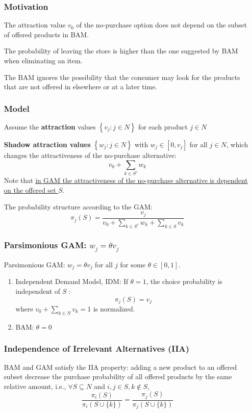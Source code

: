 \documentclass[11pt]{elegantbook}
\begin{document}
\subsubsection{Motivation}
The attraction value $v_0$ of the no-purchase option does not depend on the subset of offered products in BAM.

The probability of leaving the store is higher than the one suggested by BAM when eliminating an item.

The BAM ignores the possibility that the consumer may look for the products that are not offered in elsewhere or at a later time.

\subsubsection{Model}
Assume the \textbf{attraction} values $\left\{v_{j}: j \in N\right\}$ for each product $j \in N$

\textbf{Shadow attraction values} $\left\{w_{j}: j \in N\right\}$ with $w_{j} \in\left[0, v_{j}\right]$ for all $j \in N$, which changes the attractiveness of the no-purchase alternative:
$$
v_{0}+\sum_{k \in S^{c}} w_{k}
$$
Note that \underline{in GAM the attractiveness of the no-purchase alternative is dependent on the offered set $S$}.

The probability structure according to the GAM:
$$
\pi_{j}(S)=\frac{v_{j}}{v_{0}+\sum_{k \in S^{c}} w_{k}+\sum_{k \in S} v_{k}}
$$

\subsubsection{Parsimonious GAM: $w_{j}=\theta v_{j}$}
Parsimonious GAM: $w_{j}=\theta v_{j}$ for all $j$ for some $\theta \in[0,1]$.
\begin{enumerate}[$\bullet$]
    \item Independent Demand Model, IDM: If $\theta=1$, the choice probability is independent of $S$ :
    $$
    \pi_{j}(S)=v_{j}
    $$
    where $v_0+\sum_{k\in N}v_k=1$ is normalized.
    \item BAM: $\theta=0$
\end{enumerate}

\subsubsection{Independence of Irrelevant Alternatives (IIA)}
BAM and GAM satisfy the IIA property: adding a new product to an offered subset decrease the purchase probability of all offered products by the same relative amount, i.e., $\forall S\subseteq N$ and $i,j\in S,k\notin S$,
$$\frac{\pi_i(S)}{\pi_i(S\cup\{k\})}=\frac{\pi_j(S)}{\pi_j(S\cup\{k\})}$$
\end{document}
